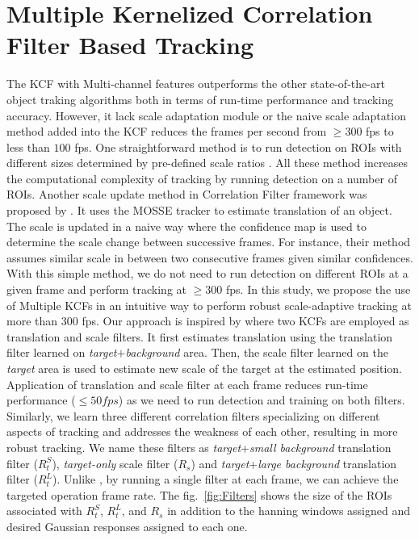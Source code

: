 \documentclass[10pt,twocolumn,letterpaper]{article}
\newcounter{ct}
\begin{document}
\section{Multiple Kernelized Correlation Filter Based Tracking}
\label{sc:MKCF}
The KCF with Multi-channel features outperforms the other state-of-the-art object traking algorithms both in terms of run-time performance and tracking accuracy. However, it lack scale adaptation module or the naive scale adaptation method added into the KCF reduces the frames per second from $\geq300$ fps to less than $100$ fps. One straightforward method is to run detection on ROIs with different sizes determined by pre-defined scale ratios \cite{henriques2015high,tang2015multi,ma2015long,bibi2015multi,li2014scale}. All these method increases the computational complexity of tracking by running detection on a number of ROIs. Another scale update method in Correlation Filter framework was proposed by \cite{zhang2014fast}. It uses the MOSSE tracker to estimate translation of an object. The scale is updated in a naive way where the confidence map is used to determine the scale change between successive frames. For instance, their method assumes similar scale in between two consecutive frames given similar confidences. With this simple method, we do not need to run detection on different ROIs at a given frame and perform tracking at $\geq300$ fps. In this study, we propose the use of Multiple KCFs in an intuitive way to perform robust scale-adaptive tracking at more than $300$ fps. Our approach is inspired by \cite{ma2015long} where two KCFs are employed as translation and scale filters. It first estimates translation using the translation filter learned on \textit{target}$+$\textit{background} area. Then, the scale filter learned on the \textit{target} area is used to estimate new scale of the target at the estimated position. Application of translation and scale filter at each frame reduces run-time performance ($\leq50 fps$) as we need to run detection and training on both filters. Similarly, we learn three different correlation filters specializing on different aspects of tracking and addresses the weakness of each other, resulting in more robust tracking. We name these filters as \textit{target}+\textit{small background} translation filter ($R_{t}^{S}$), \textit{target-only} scale filter ($R_{s}$) and \textit{target}+\textit{large background} translation filter ($R_{t}^{L}$). Unlike \cite{ma2015long}, by running a single filter at each frame, we can achieve the targeted operation frame rate. The fig.~\ref{fig:Filters} shows the size of the ROIs associated with $R_{t}^{S}$, $R_{t}^{L}$, and $R_{s}$ in addition to the hanning windows assigned and desired Gaussian responses assigned to each one.
\end{document}
